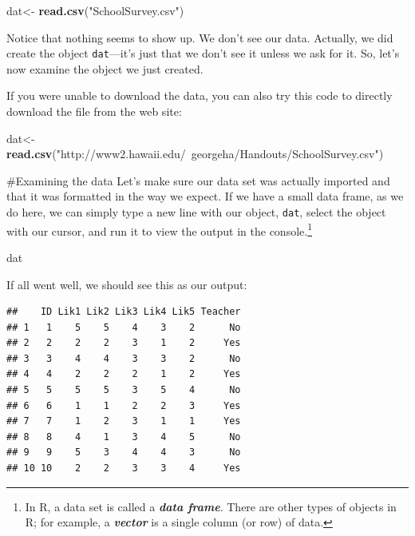 \documentclass[]{tufte-handout}
\newenvironment{Shaded}{}{}
\newcommand{\KeywordTok}[1]{\textcolor[rgb]{0.00,0.44,0.13}{\textbf{#1}}}
\newcommand{\NormalTok}[1]{#1}
\newcommand{\StringTok}[1]{\textcolor[rgb]{0.25,0.44,0.63}{#1}}
\begin{document}
\begin{Shaded}
\begin{Highlighting}[]
\NormalTok{dat<-}\StringTok{ }\KeywordTok{read.csv}\NormalTok{(}\StringTok{"SchoolSurvey.csv"}\NormalTok{)}
\end{Highlighting}
\end{Shaded}

Notice that nothing seems to show up. We don't see our data. Actually,
we did create the object \texttt{dat}---it's just that we don't see it
unless we ask for it. So, let's now examine the object we just created.

If you were unable to download the data, you can also try this code to
directly download the file from the web site:

\begin{Shaded}
\begin{Highlighting}[]
\NormalTok{dat<-}\StringTok{ }\KeywordTok{read.csv}\NormalTok{(}\StringTok{"http://www2.hawaii.edu/~georgeha/Handouts/SchoolSurvey.csv"}\NormalTok{)}
\end{Highlighting}
\end{Shaded}

\#Examining the data Let's make sure our data set was actually imported
and that it was formatted in the way we expect. If we have a small data
frame, as we do here, we can simply type a new line with our object,
\texttt{dat}, select the object with our cursor, and run it to view the
output in the console.\footnote{In R, a data set is called a
  \textbf{\emph{data frame}}. There are other types of objects in R; for
  example, a \textbf{\emph{vector}} is a single column (or row) of data.}

\begin{Shaded}
\begin{Highlighting}[]
\NormalTok{dat}
\end{Highlighting}
\end{Shaded}

If
all went well, we should see this as our output:

\begin{verbatim}
##    ID Lik1 Lik2 Lik3 Lik4 Lik5 Teacher
## 1   1    5    5    4    3    2      No
## 2   2    2    2    3    1    2     Yes
## 3   3    4    4    3    3    2      No
## 4   4    2    2    2    1    2     Yes
## 5   5    5    5    3    5    4      No
## 6   6    1    1    2    2    3     Yes
## 7   7    1    2    3    1    1     Yes
## 8   8    4    1    3    4    5      No
## 9   9    5    3    4    4    3      No
## 10 10    2    2    3    3    4     Yes
\end{verbatim}
\end{document}
